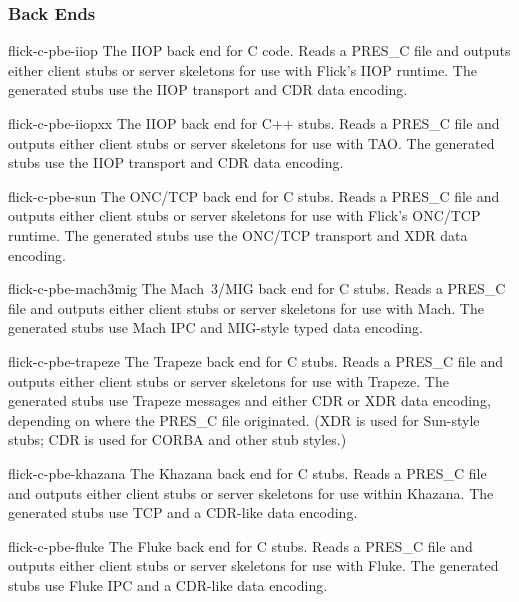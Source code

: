 \subsubsection{Back Ends}
\begin{commandlist}
  \item[flick-c-pbe-iiop] The IIOP back end for C code.  Reads a PRES\_C file
  and outputs either client stubs or server skeletons for use with Flick's IIOP
  runtime.  The generated stubs use the IIOP transport and CDR data encoding.

  \item[flick-c-pbe-iiopxx] The IIOP back end for C++ stubs.  Reads a PRES\_C
  file and outputs either client stubs or server skeletons for use with TAO\@.
  The generated stubs use the IIOP transport and CDR data encoding.

  \item[flick-c-pbe-sun] The ONC/TCP back end for C stubs.  Reads a PRES\_C
  file and outputs either client stubs or server skeletons for use with Flick's
  ONC/TCP runtime.  The generated stubs use the ONC/TCP transport and XDR data
  encoding.

  \item[flick-c-pbe-mach3mig] The Mach~3/MIG back end for C stubs.  Reads a
  PRES\_C file and outputs either client stubs or server skeletons for use with
  Mach.  The generated stubs use Mach IPC and MIG-style typed data encoding.

  \item[flick-c-pbe-trapeze] The Trapeze back end for C stubs.  Reads a PRES\_C
  file and outputs either client stubs or server skeletons for use with
  Trapeze.  The generated stubs use Trapeze messages and either CDR or XDR data
  encoding, depending on where the PRES\_C file originated.  (XDR is used for
  Sun-style stubs; CDR is used for CORBA and other stub styles.)

  \item[flick-c-pbe-khazana] The Khazana back end for C stubs.  Reads a PRES\_C
  file and outputs either client stubs or server skeletons for use within
  Khazana.  The generated stubs use TCP and a CDR-like data encoding.

  \item[flick-c-pbe-fluke] The Fluke back end for C stubs.  Reads a PRES\_C
  file and outputs either client stubs or server skeletons for use with Fluke.
  The generated stubs use Fluke IPC and a CDR-like data encoding.
\end{commandlist}

